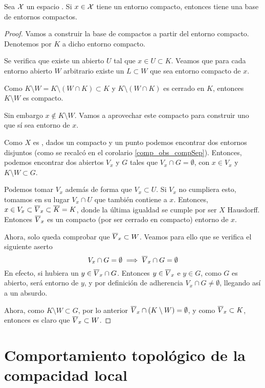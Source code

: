 \begin{prop}
	Sea $\mathcal{X}$ un espacio \hausdorff. Si $x\in \mathcal{X}$ tiene un entorno compacto, entonces tiene una base de entornos compactos.
\end{prop}
\begin{proof}
	Vamos a construir la base de compactos a partir del entorno compacto. Denotemos por $K$ a dicho entorno compacto.
	
	Se verifica que existe un abierto $U$ tal que $x\in U\subset K$. Veamos que para cada entorno abierto $W$ arbitrario existe un $L\subset W$ que sea entorno compacto de $x$.
	
	Como $K\setminus W=K\setminus (W\cap K)\subset K$ y $K\setminus (W\cap K)$ es cerrado en $K$, entonces $K\setminus W$ es compacto.
	
	Sin embargo $x\notin K\setminus W$. Vamos a aprovechar este compacto para construir uno que sí sea entorno de $x$.
	
	Como $X$ es \hausdorff, dados un compacto y un punto podemos encontrar dos entornos disjuntos (como se recalcó en el corolario \ref{comp_obs_compSep}). Entonces, podemos encontrar dos abiertos $V_x$ y $G$ tales que $V_x\cap G=\emptyset$, con $x\in V_x$ y $K\setminus W\subset G$.
	
	Podemos tomar $V_x$ además de forma que $V_x\subset U$. Si $V_x$ no cumpliera esto, tomamos en su lugar $V_x\cap U$ que también contiene a $x$. Entonces, $x\in V_x\subset \overline{V}_x\subset \overline{K}=K$, donde la última igualdad se cumple por ser $X$ Hausdorff. Entonces $\overline{V}_x$ es un compacto (por ser cerrado en compacto) entorno de $x$.
	
	Ahora, solo queda comprobar que $\overline{V}_x\subset W$. Veamos para ello que se verifica el siguiente aserto
	\[V_x\cap G=\emptyset\implies \overline{V}_x\cap G=\emptyset\]
	En efecto, si hubiera un $y\in \overline{V}_x\cap G$. Entonces $y\in\overline{V}_x$ e $y\in G$, como $G$ es abierto, será entorno de $y$, y por definición de adherencia $V_x \cap G\not=\emptyset$, llegando así a un absurdo.
	
	Ahora, como $K\setminus W\subset G$, por lo anterior $\overline{V}_x\cap (K\setminus W)=\emptyset$, y como $\overline{V}_x\subset K$, entonces es claro que $\overline{V}_x\subset W$.
\end{proof}

\section{Comportamiento topológico de la compacidad local}

